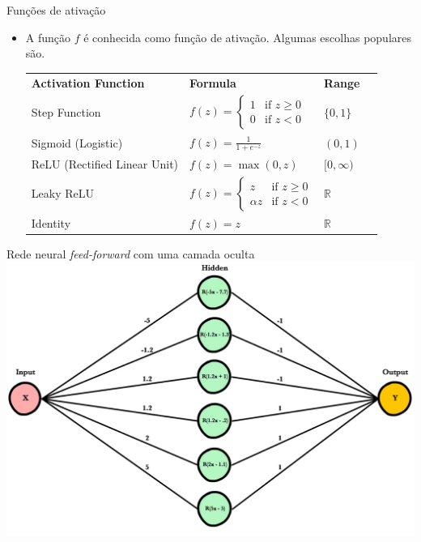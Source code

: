 \documentclass[11pt]{beamer}
\begin{document}
\begin{frame}{Funções de ativação}
	\begin{itemize}
		\item A função $f$ é conhecida como função de ativação. Algumas escolhas populares são.
		\vspace{1em}
		\begin{tabular}{llll}
			\hline
			\textbf{Activation Function} & \textbf{Formula} & \textbf{Range} \\
			Step Function & $f(z) = \begin{cases} 
				1 & \text{if } z \geq 0 \\
				0 & \text{if } z < 0 
			\end{cases}$ & $\{0, 1\}$ \\
			Sigmoid (Logistic) & $f(z) = \frac{1}{1 + e^{-z}}$ & $(0, 1)$ \\
			ReLU (Rectified Linear Unit) & $f(z) = \max(0, z)$ & $[0, \infty)$ \\
			Leaky ReLU & $f(z) = \begin{cases} 
				z & \text{if } z \geq 0 \\
				\alpha z & \text{if } z < 0
			\end{cases}$ & $\mathbb{R}$ \\
			Identity & $f(z) = z$ &$ \mathbb{R}$\\
			\hline 
		\end{tabular}

		
	\end{itemize}
\end{frame}

\begin{frame}{Rede neural \textit{feed-forward} com uma camada oculta}
\centering 
\includegraphics[scale=0.25]{graficos/single_layer.png}
\end{frame}
\end{document}
